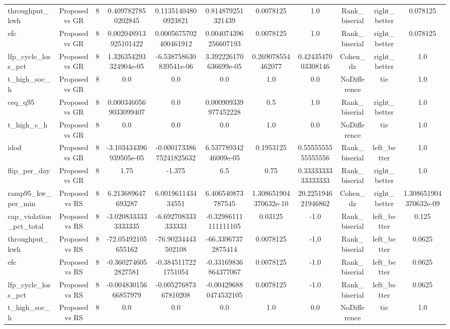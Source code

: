 \begin{table}[t]
\begin{tabular}{lcccccccccc}
throughput\_kwh & Proposed vs GR & 8 & 0.4097827850202845 & 0.11351404800923821 & 0.814879251321439 & 0.0078125 & 1.0 & Rank\_biserial & right\_better & 0.078125 \\
efc & Proposed vs GR & 8 & 0.002048913925101422 & 0.0005675702400461912 & 0.004074396256607193 & 0.0078125 & 1.0 & Rank\_biserial & right\_better & 0.078125 \\
lfp\_cycle\_loss\_pct & Proposed vs GR & 8 & 1.326354293324904e-05 & -6.538758630839541e-06 & 3.392226170636699e-05 & 0.269078554462077 & 0.4243547003308146 & Cohen\_dz & right\_better & 1.0 \\
t\_high\_soc\_h & Proposed vs GR & 8 & 0.0 & 0.0 & 0.0 & 1.0 & 0.0 & NoDifference & tie & 1.0 \\
ceq\_q95 & Proposed vs GR & 8 & 0.0003460569033099407 & 0.0 & 0.000909339977452228 & 0.5 & 1.0 & Rank\_biserial & right\_better & 1.0 \\
t\_high\_c\_h & Proposed vs GR & 8 & 0.0 & 0.0 & 0.0 & 1.0 & 0.0 & NoDifference & tie & 1.0 \\
idod & Proposed vs GR & 8 & -3.103434396939505e-05 & -0.00017338675241825632 & 6.53778934246009e-05 & 0.1953125 & 0.5555555555555556 & Rank\_biserial & left\_better & 1.0 \\
flip\_per\_day & Proposed vs GR & 8 & 1.75 & -1.375 & 6.5 & 0.75 & 0.3333333333333333 & Rank\_biserial & right\_better & 1.0 \\
ramp95\_kw\_per\_min & Proposed vs RS & 8 & 6.213689647693287 & 6.001961143434551 & 6.406540873787545 & 1.308651904370632e-10 & 20.225194621946862 & Cohen\_dz & right\_better & 1.308651904370632e-09 \\
cap\_violation\_pct\_total & Proposed vs RS & 8 & -3.0208333333333335 & -6.692708333333333 & -0.32986111111111105 & 0.03125 & -1.0 & Rank\_biserial & left\_better & 0.125 \\
throughput\_kwh & Proposed vs RS & 8 & -72.05492105655162 & -76.90234443502108 & -66.33967372875414 & 0.0078125 & -1.0 & Rank\_biserial & left\_better & 0.0625 \\
efc & Proposed vs RS & 8 & -0.3602746052827581 & -0.3845117221751054 & -0.33169836864377067 & 0.0078125 & -1.0 & Rank\_biserial & left\_better & 0.0625 \\
lfp\_cycle\_loss\_pct & Proposed vs RS & 8 & -0.00483015666857979 & -0.00527687367810208 & -0.004296880474532105 & 0.0078125 & -1.0 & Rank\_biserial & left\_better & 0.0625 \\
t\_high\_soc\_h & Proposed vs RS & 8 & 0.0 & 0.0 & 0.0 & 1.0 & 0.0 & NoDifference & tie & 1.0 \\

\end{tabular}
\end{table}
